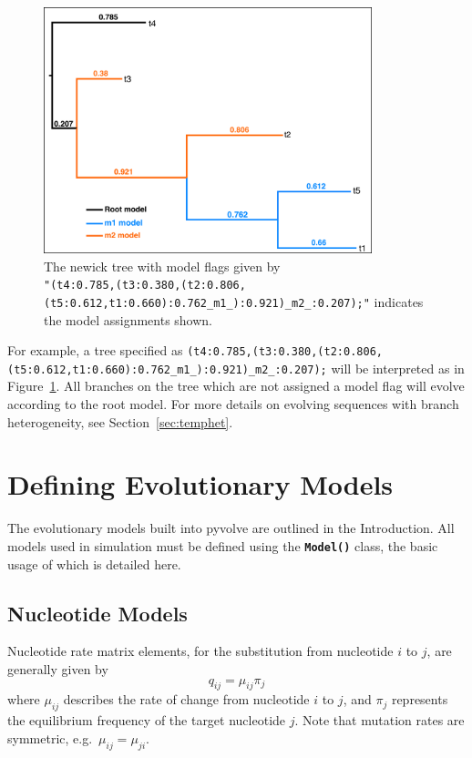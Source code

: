 \documentclass{article}
\newcommand{\code}[1]{\textbf{\texttt{\small{#1}}}}
\begin{document}
\begin{figure}[htpb]%
	\includegraphics[width=3.75in]{treeflags.pdf}
	\caption{\label{fig:treeflags} The newick tree with model flags given by \\ \texttt{\scriptsize{"(t4:0.785,(t3:0.380,(t2:0.806,(t5:0.612,t1:0.660):0.762\_m1\_):0.921)\_m2\_:0.207);"}}
		indicates the model assignments shown.}
\end{figure}

For example, a tree specified as  \texttt{\scriptsize{(t4:0.785,(t3:0.380,(t2:0.806,(t5:0.612,t1:0.660):0.762\_m1\_):0.921)\_m2\_:0.207);}} will be interpreted as in Figure~\ref{fig:treeflags}. All branches on the tree which are not assigned a model flag will evolve according to the root model. For more details on evolving sequences with branch heterogeneity, see Section~\ref{sec:temphet}.


\section{Defining Evolutionary Models}\label{sec:evomodels}

The evolutionary models built into pyvolve are outlined in the Introduction. All models used in simulation must be defined using the \code{Model()} class, the basic usage of which is detailed here.

\subsection{Nucleotide Models}\label{sec:nucleotide_basic}

Nucleotide rate matrix elements, for the substitution from nucleotide $i$ to $j$, are generally given by 
\begin{equation}
q_{ij} = \mu_{ij} \pi_j
\end{equation}
where $\mu_{ij}$ describes the rate of change from nucleotide $i$ to $j$, and $\pi_j$ represents the equilibrium frequency of the target nucleotide $j$. Note that mutation rates are symmetric, e.g.\ $\mu_{ij} = \mu_{ji}$. 
\end{document}
